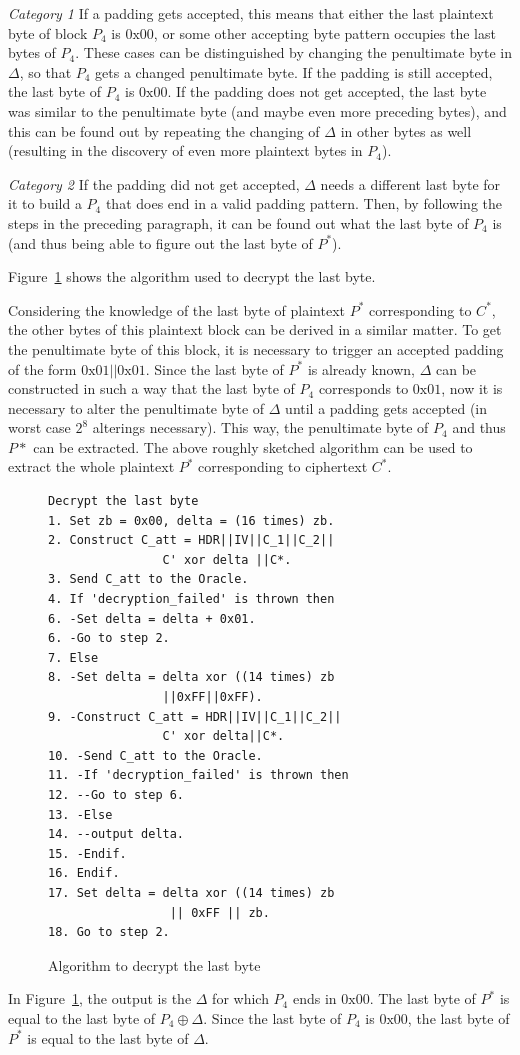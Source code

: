 \documentclass[10pt,conference,a4paper]{IEEEtran}
\begin{document}
\textit{Category 1} If a padding gets accepted, this means that either the last plaintext byte of block $P_4$ is $0\text{x}00$, or some other accepting byte pattern occupies the last bytes of $P_4$. These cases can be distinguished by changing the penultimate byte in $\Delta$, so that $P_4$ gets a changed penultimate byte. If the padding is still accepted, the last byte of $P_4$ is $0\text{x}00$. If the padding does not get accepted, the last byte was similar to the penultimate byte (and maybe even more preceding bytes), and this can be found out by repeating the changing of $\Delta$ in other bytes as well (resulting in the discovery of even more plaintext bytes in $P_4$).

\textit{Category 2} If the padding did not get accepted, $\Delta$ needs a different last byte for it to build a $P_4$ that does end in a valid padding pattern. Then, by following the steps in the preceding paragraph, it can be found out what the last byte of $P_4$ is (and thus being able to figure out the last byte of $P^{*}$).

Figure~\ref{sec:paddingoracle:padding:lastbyte} shows the algorithm used to decrypt the last byte.

Considering the knowledge of the last byte of plaintext $P^{*}$ corresponding to $C^{*}$, the other bytes of this plaintext block can be derived in a similar matter. To get the penultimate byte of this block, it is necessary to trigger an accepted padding of the form $0\text{x}01||0\text{x}01$. Since the last byte of $P^{*}$ is already known, $\Delta$ can be constructed in such a way that the last byte of $P_4$ corresponds to $0\text{x}01$, now it is necessary to alter the penultimate byte of $\Delta$ until a padding gets accepted (in worst case $2^8$ alterings necessary). This way, the penultimate byte of $P_4$ and thus $P{*}$ can be extracted. The above roughly sketched algorithm can be used to extract the whole plaintext $P^{*}$ corresponding to ciphertext $C^{*}$.

\begin{figure}
\begin{verbatim}
Decrypt the last byte
1. Set zb = 0x00, delta = (16 times) zb.
2. Construct C_att = HDR||IV||C_1||C_2||
                C' xor delta ||C*.
3. Send C_att to the Oracle.
4. If 'decryption_failed' is thrown then
6. -Set delta = delta + 0x01.
6. -Go to step 2.
7. Else
8. -Set delta = delta xor ((14 times) zb
                ||0xFF||0xFF).
9. -Construct C_att = HDR||IV||C_1||C_2||
                C' xor delta||C*.
10. -Send C_att to the Oracle.
11. -If 'decryption_failed' is thrown then
12. --Go to step 6.
13. -Else
14. --output delta.
15. -Endif.
16. Endif.
17. Set delta = delta xor ((14 times) zb
                 || 0xFF || zb.
18. Go to step 2.
\end{verbatim}
\caption{Algorithm to decrypt the last byte}
\label{sec:paddingoracle:padding:lastbyte}
\end{figure}
In Figure~\ref{sec:paddingoracle:padding:lastbyte}, the output is the $\Delta$ for which $P_4$ ends in $0\text{x}00$. The last byte of $P^{*}$ is equal to the last byte of $P_4 \oplus \Delta$. Since the last byte of $P_4$ is $0\text{x}00$, the last byte of $P^{*}$ is equal to the last byte of $\Delta$.
\end{document}

